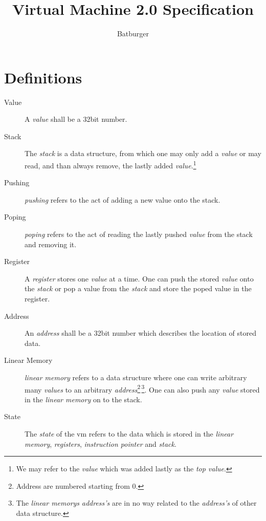\documentclass[10pt,a4paper]{article}
\author{Batburger}
\title{Virtual Machine 2.0 Specification}
\begin{document}
	\tt
	
	\maketitle
	\section{Definitions}
	\label{definitions}
	\begin{description}
		\item[Value] A \textit{value} shall be a 32bit number.
		
		\item[Stack] The \textit{stack} is a data structure, from which one may only add a \textit{value} or may read, and than always remove, the lastly added \textit{value}.\footnote{We may refer to the \textit{value} which was added lastly as the \textit{top value}.} 

		\item[Pushing] \textit{pushing} refers to the act of adding a new value onto the stack.
		
		\item[Poping] \textit{poping} refers to the act of reading the lastly pushed	 \textit{value} from the stack and removing it.

		\item[Register] A \textit{register} stores one \textit{value} at a time. One can push the stored \textit{value} onto the \textit{stack} or pop a value from the \textit{stack} and store the poped value in the register.
		
		\item[Address] An \textit{address} shall be a 32bit number which describes the location of stored data.  		
		
		\item[Linear Memory] \textit{linear memory} refers to a data structure where one can write arbitrary many \textit{values} to an arbitrary \textit{address}\footnote{Address are numbered starting from 0.}\,\footnote{The \textit{linear memorys} \textit{address's} are in no way related to the \textit{address's} of other data structure.}. One can also push any \textit{value} stored in the \textit{linear memory} on to the stack.
		
		\item[State] The \textit{state} of the vm refers to the data which is stored in the \textit{linear memory}, \textit{registers}, \textit{instruction pointer} and \textit{stack}.		
		

\end{description}
\end{document}
